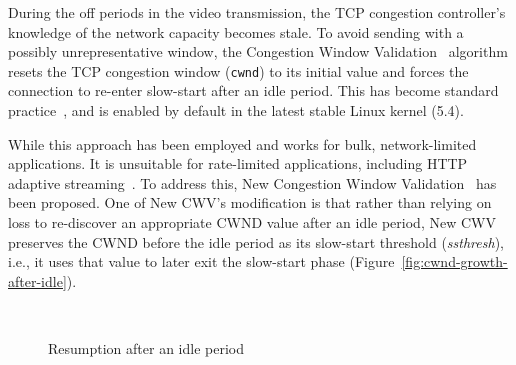 \documentclass[10pt,sigconf,anonymous]{acmart}
\begin{document}

During the off periods in the video transmission, the TCP congestion controller's knowledge of the network capacity becomes stale. To avoid sending with a possibly unrepresentative window, the Congestion Window Validation~\cite{rfc2861-2000-padhye-congestion-window-validation} algorithm resets the TCP congestion window (\texttt{cwnd}) to its initial value and forces the connection to re-enter slow-start after an idle period. This has become standard practice~\cite{rfc5681-congeston-control}, and is enabled by default in the latest stable Linux kernel (5.4).

While this approach has been employed and works for bulk, network-limited applications. It is unsuitable for rate-limited applications, including HTTP adaptive streaming~\cite{Esteban-2012-Interactions-HTTP-TCP}. To address this, New Congestion Window Validation~\cite{rfc7661-2015-fairhurst-new-cwnd-validation} has been proposed. One of New CWV's modification is that rather than relying on loss to re-discover an appropriate CWND value after an idle period, New CWV preserves the CWND before the idle period as its slow-start threshold (\emph{ssthresh}), i.e., it uses that value to later exit the slow-start phase (Figure~\ref{fig:cwnd-growth-after-idle}).

\begin{figure}[t!]
  \centering
    \\

    \caption{Resumption after an idle period}
    \label{fig:transmission-after-idle}
\end{figure}
\end{document}
